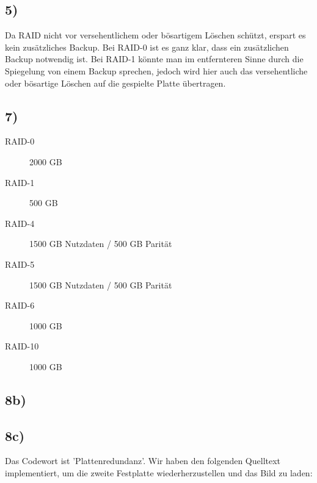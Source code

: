 \documentclass[ngerman]{fbi-aufgabenblatt}
\begin{document}
\subsection*{5)}
Da RAID nicht vor versehentlichem oder bösartigem Löschen schützt, erspart es kein zusätzliches Backup.
\newline
Bei RAID-0 ist es ganz klar, dass ein zusätzlichen Backup notwendig ist. Bei RAID-1 könnte man im entfernteren Sinne
durch die Spiegelung von einem Backup sprechen, jedoch wird hier auch das versehentliche oder bösartige Löschen auf
die gespielte Platte übertragen. 

\subsection*{7)}
\begin{description}
	\item[RAID-0] 2000 GB
	\item [RAID-1] 500 GB
	\item [RAID-4] 1500 GB Nutzdaten / 500 GB Parität
	\item [RAID-5] 1500 GB Nutzdaten / 500 GB Parität
	\item [RAID-6] 1000 GB
	\item[RAID-10] 1000 GB
\end{description} 

\subsection*{8b)}

\subsection*{8c)}
Das Codewort ist 'Plattenredundanz'. Wir haben den folgenden Quelltext implementiert, um die zweite Festplatte wiederherzustellen und das Bild zu laden:
\end{document}
